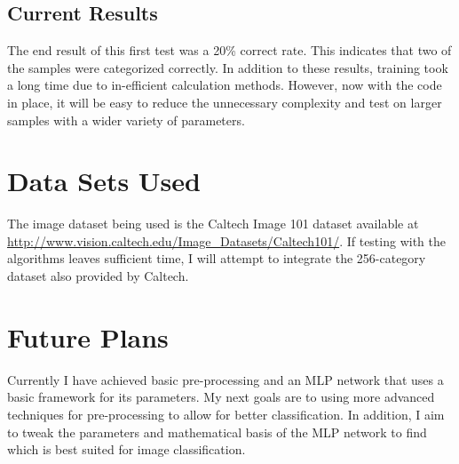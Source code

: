 \documentclass[paper=a4, fontsize=11pt]{scrartcl} %
\numberwithin{equation}{section} %
\numberwithin{figure}{section} %
\numberwithin{table}{section} %
\begin{document}
	\subsection{Current Results}
	The end result of this first test was a 20\% correct rate. This indicates that two of the samples were categorized correctly. In addition to these results, training took a long time due to in-efficient calculation methods. However, now with the code in place, it will be easy to reduce the unnecessary complexity and test on larger samples with a wider variety of parameters.
	
	\section{Data Sets Used}
	The image dataset being used is the Caltech Image 101 dataset available at \url{http://www.vision.caltech.edu/Image_Datasets/Caltech101/}. If testing with the algorithms leaves sufficient time, I will attempt to integrate the 256-category dataset also provided by Caltech.
	
	\section{Future Plans}
	Currently I have achieved basic pre-processing and an MLP network that uses a basic framework for its parameters. My next goals are to using more advanced techniques for pre-processing to allow for better classification. In addition, I aim to tweak the parameters and mathematical basis of the MLP network to find which is best suited for image classification. 
			
	
\end{document}
